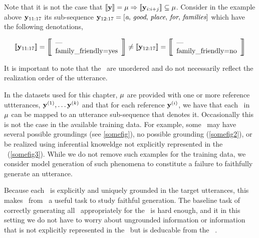 Note that it is not the case that $\left\llbracket \mathbf{y} \right\rrbracket = \mu \Rightarrow \left\llbracket \mathbf{y}_{i:i+j} \right\rrbracket \subseteq \mu$. Consider in the example above $\mathbf{y}_{11:17}$ its sub-sequence $\mathbf{y}_{12:17} = \left[\textit{a},\,\textit{good},\,\textit{place},\,\textit{for},\,\textit{families}\right]$ which have
the following denotations,
\begin{singlespace}
   \[
   \denotes{\utttoks_{11:17}} = \left[\!\!\left[\begin{array}{l}\textrm{---}\\ \AV{family\_friendly}{yes} \end{array}\right]\!\!\right] \ne \denotes{\utttoks_{12:17}}= \left[\!\!\left[\begin{array}{l}\textrm{---}\\ \AV{family\_friendly}{no} \end{array}\right]\!\!\right] 
       \]
   \end{singlespace}
\noindent It is important to note that the \attributevalues~are
unordered and do not necessarily reflect the realization order of the 
utterance. 


   In the datasets used for this chapter, $\mu$ are provided with one or more reference uttterances, $\mathbf{y}^{(1)}, \ldots \mathbf{y}^{(k)}$ and that for each reference $\mathbf{y}^{(i)}$, we have that each 
\attributevalue~in $\mu$ can be mapped to an 
utterance sub-sequence that denotes it.
Occasionally this is not the case in the available
training data. For example, some \attributevalues~may have several possible
groundings (see \autoref{somefig}), 
no possible grounding (\autoref{somefig2}),
or be realized using inferential knoweldge not explicitly 
represented in the \meaningrepresentation~(\autoref{somefig3}). While we 
do not remove such examples for the training data, we consider model 
generation of such phenomena to constitute a failure to faithfully generate
an utterance.  
 
Because each \attributevalue~is explicitly and uniquely grounded in the 
target utterances, this makes \surfacerealization~from 
\meaningrepresentations~a useful task to study faithful generation. The
baseline task of correctly generating all \attributevalues~appropriately 
for the \dialogueact~is hard enough, and it in this setting we do not have
to worry about ungrounded information or information that is not explicitly
represented in the \meaningrepresentations~but is deducable from
the \meaningrepresentation~\citep{cleanuprotowire}.  
 
\clearpage

